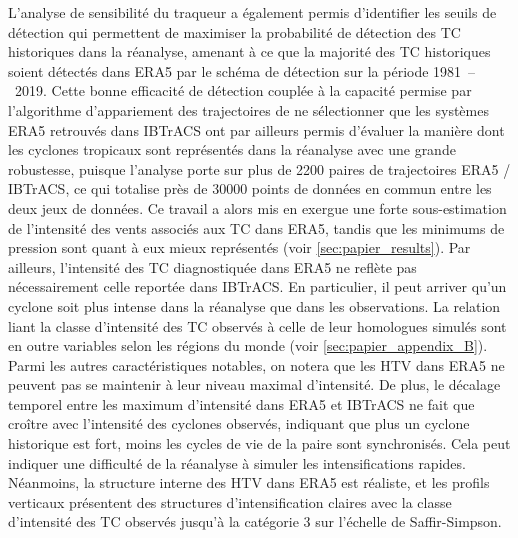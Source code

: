 \documentclass[../main.tex]{subfiles}
\begin{document}
L'analyse de sensibilité du traqueur a également permis d'identifier les seuils de détection qui permettent de maximiser la probabilité de détection des TC
historiques dans la réanalyse, amenant à ce que la majorité des TC historiques soient détectés dans ERA5 par le schéma de détection sur la période
\num{1981}~--~\num{2019}. Cette bonne efficacité de détection couplée à la capacité permise par l'algorithme d'appariement des trajectoires de ne sélectionner
que les systèmes ERA5 retrouvés dans IBTrACS ont par ailleurs permis d'évaluer la manière dont les cyclones tropicaux sont représentés dans la réanalyse avec
une grande robustesse, puisque l'analyse porte sur plus de \num{2200} paires de trajectoires ERA5 / IBTrACS, ce qui totalise près de \num{30000} points de
données en commun entre les deux jeux de données. Ce travail a alors mis en exergue une forte sous-estimation de l'intensité des vents associés aux TC dans
ERA5, tandis que les minimums de pression sont quant à eux mieux représentés (voir \cref{sec:papier_results}). Par ailleurs, l'intensité des TC diagnostiquée
dans ERA5 ne reflète pas nécessairement celle reportée dans IBTrACS. En particulier, il peut arriver qu'un cyclone soit plus intense dans la réanalyse que dans
les observations. La relation liant la classe d'intensité des TC observés à celle de leur homologues simulés sont en outre variables selon les régions du monde
(voir \cref{sec:papier_appendix_B}). Parmi les autres caractéristiques notables, on notera que les HTV dans ERA5 ne peuvent pas se maintenir à leur niveau
maximal d'intensité. De plus, le décalage temporel entre les maximum d'intensité dans ERA5 et IBTrACS ne fait que croître avec l'intensité des cyclones
observés, indiquant que plus un cyclone historique est fort, moins les cycles de vie de la paire sont synchronisés. Cela peut indiquer une difficulté de la
réanalyse à simuler les intensifications rapides. Néanmoins, la structure interne des HTV dans ERA5 est réaliste, et les profils verticaux présentent des
structures d'intensification claires avec la classe d'intensité des TC observés jusqu'à la catégorie 3 sur l'échelle de Saffir-Simpson.
\end{document}
